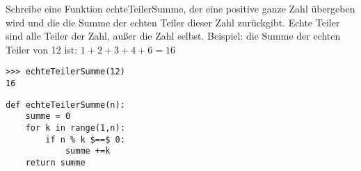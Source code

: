 \question[4] Schreibe eine Funktion echteTeilerSumme, der eine positive ganze Zahl
übergeben wird und die die Summe der echten Teiler dieser Zahl zurückgibt.
Echte Teiler sind alle Teiler der Zahl, außer die Zahl selbst.
Beispiel: die Summe der echten Teiler von 12 ist: $1+2+3+4+6 = 16$
\begin{lstlisting}
>>> echteTeilerSumme(12)
16
\end{lstlisting}
\begin{solutionbox}{4cm}
\begin{lstlisting}
def echteTeilerSumme(n):
    summe = 0
    for k in range(1,n):
        if n % k $==$ 0:
            summe +=k
    return summe
\end{lstlisting}
\end{solutionbox}
